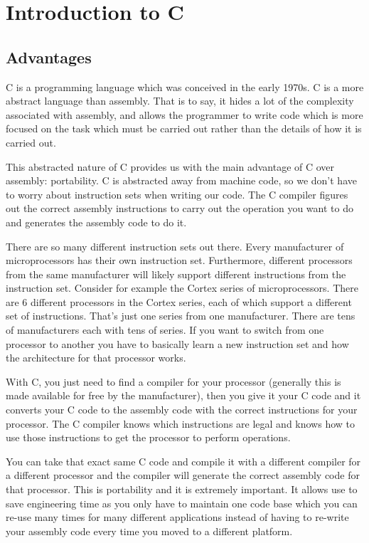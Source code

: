 \chapter{Introduction to C}
\section{Advantages}
C is a programming language which was conceived in the early 1970s. 
C is a more abstract language than assembly.
That is to say, it hides a lot of the complexity associated with assembly, and allows the programmer to write code which is more focused on the task which must be carried out rather than the details of how it is carried out.

This abstracted nature of C provides us with the main advantage of C over assembly: portability. 
C is abstracted away from machine code, so we don't have to worry about instruction sets when writing our code. 
The C compiler figures out the correct assembly instructions to carry out the operation you want to do and generates the assembly code to do it.

There are so many different instruction sets out there. 
Every manufacturer of microprocessors has their own instruction set. 
Furthermore, different processors from the same manufacturer will likely support different instructions from the instruction set.
Consider for example the Cortex series of microprocessors. 
There are 6 different processors in the Cortex series, each of which support a different set of instructions. 
That's just one series from one manufacturer. There are tens of manufacturers each with tens of series. 
If you want to switch from one processor to another you have to basically learn a new instruction set and how the architecture for that processor works. 

With C, you just need to find a compiler for your processor (generally this is made available for free by the manufacturer), then you give it your C code and it converts your C code to the assembly code with the correct instructions for your processor. The C compiler knows which instructions are legal and knows how to use those instructions to get the processor to perform operations.

You can take that exact same C code and compile it with a different compiler for a different processor and the compiler will generate the correct assembly code for that processor. 
This is portability and it is extremely important. 
It allows use to save engineering time as you only have to maintain one code base which you can re-use many times for many different applications instead of having to re-write your assembly code every time you moved to a different platform.\\

